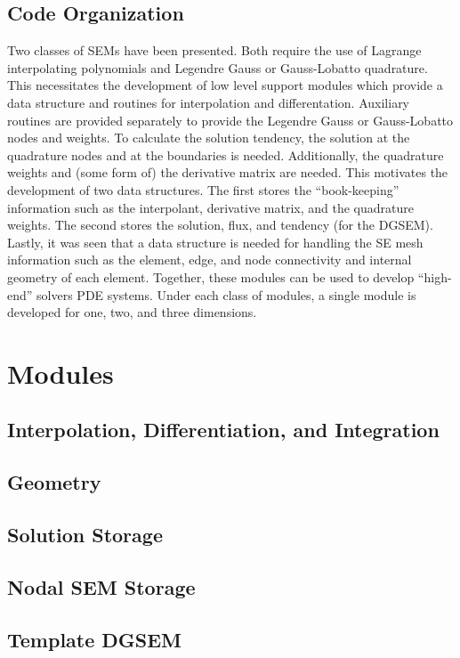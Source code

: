 \documentclass[12pt]{softwaremanual}
\begin{document}
\section{Code Organization}
Two classes of SEMs have been presented. Both require the use of Lagrange interpolating polynomials and Legendre Gauss or Gauss-Lobatto quadrature. This necessitates the development of low level support modules which provide a data structure and routines for interpolation and differentation. Auxiliary routines are provided separately to provide the Legendre Gauss or Gauss-Lobatto nodes and weights. To calculate the solution tendency, the solution at the quadrature nodes and at the boundaries is needed. Additionally, the quadrature weights and (some form of) the derivative matrix are needed. This motivates the development of two data structures. The first stores the ``book-keeping'' information such as the interpolant, derivative matrix, and the quadrature weights. The second stores the solution, flux, and tendency (for the DGSEM). Lastly, it was seen that a data structure is needed for handling the SE mesh information such as the element, edge, and node connectivity and internal geometry of each element. Together, these modules can be used to develop ``high-end'' solvers PDE systems. Under each class of modules, a single module is developed for one, two, and three dimensions.


\chapter{Modules}
\section{Interpolation, Differentiation, and Integration}

\section{Geometry}

\section{Solution Storage}

\section{Nodal SEM Storage}

\section{Template DGSEM}
\end{document}
